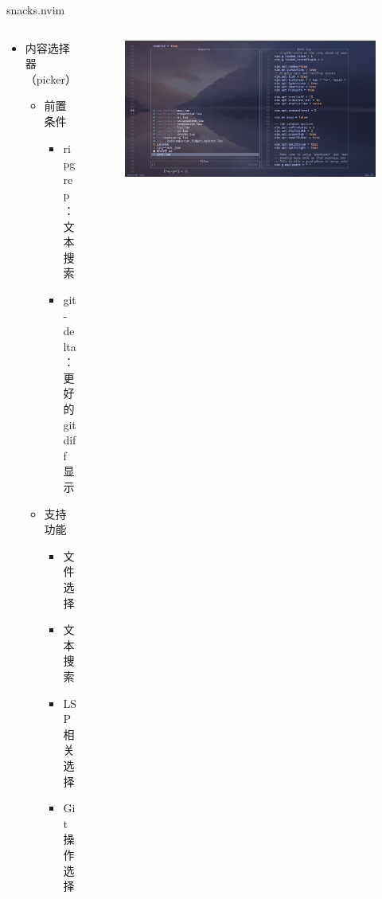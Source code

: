 \documentclass[aspectratio=169]{ctexbeamer}
\begin{document}
  \begin{frame}{snacks.nvim}
    \begin{columns}
      \begin{column}{0.4\linewidth}
        \begin{itemize}
          \item 内容选择器（picker）
            \begin{itemize}
              \item 前置条件
                \begin{itemize}
                  \item ripgrep：文本搜索 %
                  \item git-delta：更好的git diff显示 %
                \end{itemize}
              \item 支持功能
                \begin{itemize}
                  \item 文件选择
                  \item 文本搜索 %
                  \item LSP相关选择
                  \item Git操作选择
                \end{itemize}
            \end{itemize}
        \end{itemize}
      \end{column}

      \begin{column}{0.6\linewidth}
        \begin{figure}[H]
          \centering
          \includegraphics[width=\linewidth]{./Figures/Snacks_Config_7_Picker.jpg}
        \end{figure}
      \end{column}
    \end{columns}
  \end{frame}
\end{document}
